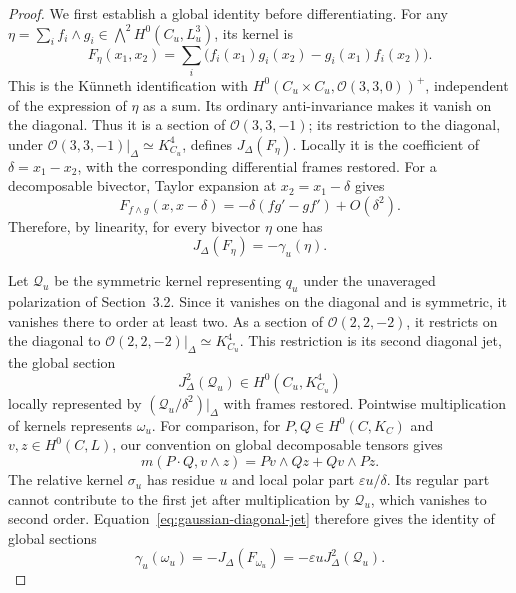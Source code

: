 \documentclass[11pt]{article}
\newcommand{\OO}{\mathcal O}
\begin{document}
\begin{proof}
We first establish a global identity before differentiating. For any
$\eta=\sum_i f_i\wedge g_i\in\bigwedge^2H^0(C_u,L_u^3)$, its kernel is
\[
F_\eta(x_1,x_2)=\sum_i
\bigl(f_i(x_1)g_i(x_2)-g_i(x_1)f_i(x_2)\bigr).
\]
This is the K\"unneth identification with
$H^0(C_u\times C_u,\OO(3,3,0))^+$, independent of the expression of
$\eta$ as a sum. Its ordinary anti-invariance makes it vanish on
the diagonal. Thus it is a section of $\OO(3,3,-1)$; its restriction
to the diagonal, under
$\OO(3,3,-1)|_\Delta\simeq K_{C_u}^4$, defines
$J_\Delta(F_\eta)$. Locally it is the coefficient of
$\delta=x_1-x_2$, with the corresponding differential frames restored.
For a decomposable bivector, Taylor expansion at $x_2=x_1-\delta$ gives
\[
F_{f\wedge g}(x,x-\delta)
=-\delta(fg'-gf')+O(\delta^2).
\]
{Therefore, by linearity, for every bivector $\eta$ one has}
\begin{equation}
\label{eq:gaussian-diagonal-jet}
J_\Delta(F_\eta)=-\gamma_u(\eta).
\end{equation}

Let $\mathcal Q_u$ be the symmetric kernel representing $q_u$ under
the unaveraged polarization of Section~3.2. Since it vanishes on the
diagonal and is symmetric, it vanishes there to order at least two.
As a section of $\OO(2,2,-2)$, it restricts on the diagonal to
$\OO(2,2,-2)|_\Delta\simeq K_{C_u}^4$.
This restriction is its second diagonal jet, the global section
\[
J_\Delta^2(\mathcal Q_u)\in H^0(C_u,K_{C_u}^4)
\]
locally represented by $(\mathcal Q_u/\delta^2)|_\Delta$ with frames
restored. Pointwise multiplication of kernels represents $\omega_u$.
For comparison, for $P,Q\in H^0(C,K_C)$ and $v,z\in H^0(C,L)$,
our convention on global decomposable tensors gives
\begin{equation}
\label{eq:multiplication-formula}
m(P\cdot Q,v\wedge z)=Pv\wedge Qz+Qv\wedge Pz.
\end{equation}
The relative kernel $\sigma_u$ has residue $u$ and local polar part
$\varepsilon u/\delta$. Its regular part cannot contribute to the
first jet after multiplication by $\mathcal Q_u$, which vanishes to
second order. Equation~\eqref{eq:gaussian-diagonal-jet} therefore gives
the identity of
global sections
\begin{equation}
\label{eq:total-gaussian-identity}
\gamma_u(\omega_u)=
-J_\Delta(F_{\omega_u})=
-\varepsilon u J_\Delta^2(\mathcal Q_u).
\end{equation}


\end{proof}
\end{document}
